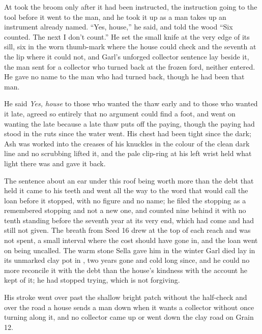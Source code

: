 \scenebreak

At   took the broom only after it had been instructed, the instruction going to the tool before it went to the man, and he took it up as a man takes up an instrument already named. “Yes, house,” he said, and told the wood “Six counted. The next I don't count.” He set the small knife at the very edge of its sill, six in the worn thumb-mark where the house could check and the seventh at the lip where it could not, and Garl's unforged collector sentence lay beside it, the man sent for a collector who turned back at the frozen ford, neither entered. He gave no name to the man who had turned back, though he had been that man.

He said \emph{Yes, house} to those who wanted the thaw early and to those who wanted it late, agreed so entirely that no argument could find a foot, and went on wanting the late because a late thaw puts off the paying, though the paying had stood in the ruts since the water went. His chest had been tight since the dark; Ash was worked into the creases of his knuckles in the colour of the clean dark line and no scrubbing lifted it, and the pale clip-ring at his left wrist held what light there was and gave it back.

The sentence about an ear under this roof being worth more than the debt that held it came to his teeth and went all the way to the word that would call the loan before it stopped, with no figure and no name; he filed the stopping as a remembered stopping and not a new one, and counted nine behind it with no tenth standing before the seventh year at its very end, which had come and had still not given. The breath from Seed 16 drew at the top of each reach and was not spent, a small interval where the cost should have gone in, and the loan went on being uncalled. The warm stone Sella gave him in the winter Garl died lay in its unmarked clay pot in , two years gone and cold long since, and he could no more reconcile it with the debt than the house's kindness with the account he kept of it; he had stopped trying, which is not forgiving.

His stroke went over  past the shallow bright patch without the half-check and over the road a house sends a man down when it wants a collector without once turning along it, and no collector came up or went down the clay road on Grain 12.

\scenebreak

